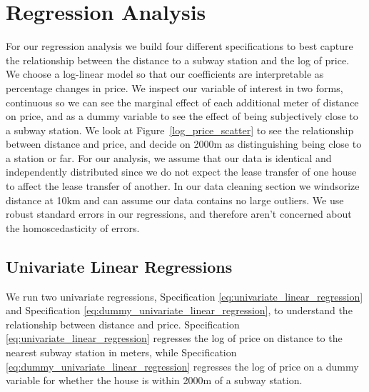 \section{Regression Analysis}
\label{sec:regression_analysis}

For our regression analysis we build four different specifications to best capture the 
relationship between the distance to a subway station and the log of price. We choose a log-linear model so that our coefficients
are interpretable as percentage changes in price. We inspect our variable of interest in two forms, continuous so we can 
see the marginal effect of each additional meter of distance on price, and as a dummy variable to see the effect of being subjectively close to a subway station.
We look at Figure~\ref{log_price_scatter} to see the relationship between distance and price, and decide on 2000m as distinguishing being close to a station or far.
For our analysis, we assume that our data is identical and independently distributed since we do not expect the lease transfer of one house to affect the lease transfer of another.
In our data cleaning section we windsorize distance at 10km and can assume our data contains no large outliers.
We use robust standard errors in our regressions, and therefore aren't concerned about the homoscedasticity of errors.

\subsection{Univariate Linear Regressions}
We run two univariate regressions, Specification \ref{eq:univariate_linear_regression} and Specification \ref{eq:dummy_univariate_linear_regression}, to understand the relationship between distance and price.
Specification \ref{eq:univariate_linear_regression} regresses the log of price on distance to the nearest subway station in meters, while Specification \ref{eq:dummy_univariate_linear_regression} regresses the log of price on a dummy variable for whether the house is within 2000m of a subway station.
